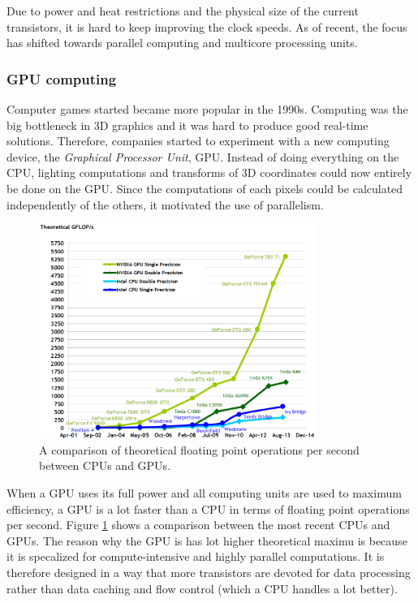 Due to power and heat restrictions and the physical size of the current transistors, it is hard to keep improving the clock speeds. As of recent, the focus has shifted towards parallel computing and multicore processing units.

\subsubsection{GPU computing}

Computer games started became more popular in the 1990s. Computing was the big bottleneck in 3D graphics and it was hard to produce good real-time solutions. Therefore, companies started to experiment with a new computing device, the \emph{Graphical Processor Unit}, GPU. Instead of doing everything on the CPU, lighting computations and transforms of 3D coordinates could now entirely be done on the GPU. Since the computations of each pixels could be calculated independently of the others, it motivated the use of parallelism. 

\begin{figure}[ht!]
\centering
\includegraphics[width=90mm]{img/flops.png}
\caption{A comparison of theoretical floating point operations per second between CPUs and GPUs.}
\label{flops}
\end{figure}

When a GPU uses its full power and all computing units are used to maximum efficiency, a GPU is a lot faster than a CPU in terms of floating point operations per second. Figure \ref{flops} shows a comparison between the most recent CPUs and GPUs. The reason why the GPU is has lot higher theoretical maximu is because it is specalized for compute-intensive and highly parallel computations. It is therefore designed in a way that more transistors are devoted for data processing rather than data caching and flow control (which a CPU handles a lot better). 
